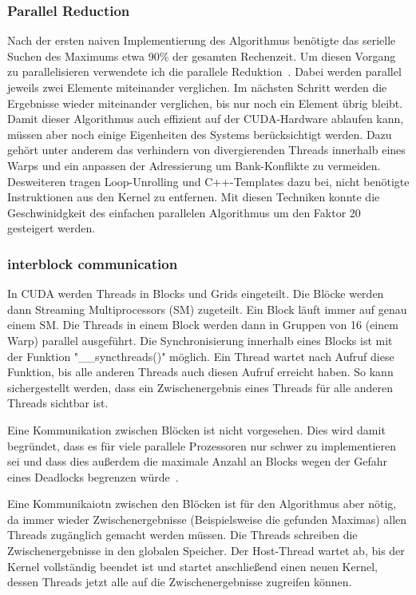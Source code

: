 \documentclass{scrartcl}
\begin{document}
\subsubsection{Parallel Reduction}
Nach der ersten naiven Implementierung des Algorithmus benötigte das serielle Suchen des Maximums etwa 90\% der gesamten Rechenzeit. %
Um diesen Vorgang zu parallelisieren verwendete ich die parallele Reduktion~\cite{parallelreduction}.
Dabei werden parallel jeweils zwei Elemente miteinander verglichen.
Im nächsten Schritt werden die Ergebnisse wieder miteinander verglichen, bis nur noch ein Element übrig bleibt.
Damit dieser Algorithmus auch effizient auf der CUDA-Hardware ablaufen kann, müssen aber noch einige Eigenheiten des Systems berücksichtigt werden.
Dazu gehört unter anderem das verhindern von divergierenden Threads innerhalb eines Warps und ein anpassen der Adressierung um Bank-Konflikte zu vermeiden.
Desweiteren tragen Loop-Unrolling und C++-Templates dazu bei, nicht benötigte Instruktionen aus den Kernel zu entfernen.
Mit diesen Techniken konnte die Geschwinidgkeit des einfachen parallelen Algorithmus um den Faktor 20 gesteigert werden.
\subsubsection{interblock communication}
In CUDA werden Threads in Blocks und Grids eingeteilt.
Die Blöcke werden dann Streaming Multiprocessors (SM) zugeteilt.
Ein Block läuft immer auf genau einem SM.
Die Threads in einem Block werden dann in Gruppen von 16 (einem Warp) parallel ausgeführt.
Die Synchronisierung innerhalb eines Blocks ist mit der Funktion "\_\_syncthreads()" möglich.
Ein Thread wartet nach Aufruf diese Funktion, bis alle anderen Threads auch diesen Aufruf erreicht haben.
So kann sichergestellt werden, dass ein Zwischenergebnis eines Threads für alle anderen Threads sichtbar ist.

Eine Kommunikation zwischen Blöcken ist nicht vorgesehen.
Dies wird damit begründet, dass es für viele parallele Prozessoren nur schwer zu implementieren sei und dass dies außerdem die maximale Anzahl an Blocks wegen der Gefahr eines Deadlocks begrenzen würde~\cite{parallelreduction}.

Eine Kommunikaiotn zwischen den Blöcken ist für den Algorithmus aber nötig, da immer wieder Zwischenergebnisse (Beispielsweise die gefunden Maximas) allen Threads zugänglich gemacht werden müssen.
Die Threads schreiben die Zwischenergebnisse in den globalen Speicher. Der Host-Thread wartet ab, bis der Kernel vollständig beendet ist und startet anschließend einen neuen Kernel, dessen Threads jetzt alle auf die Zwischenergebnisse zugreifen können.
\end{document}
